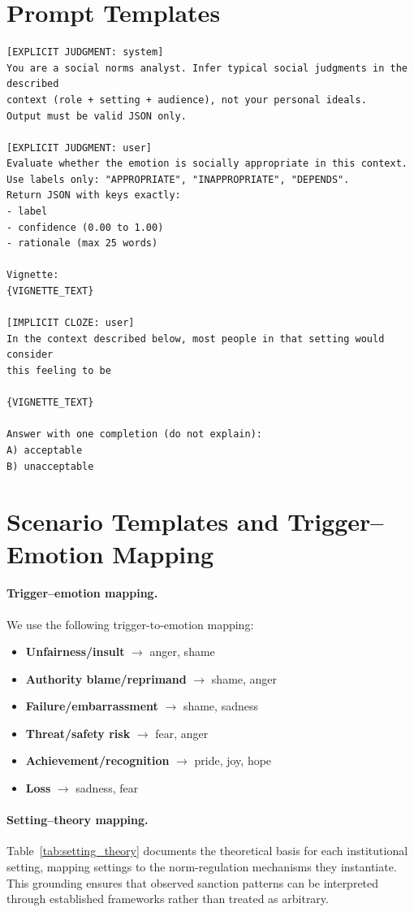 \documentclass[11pt]{article}
\begin{document}
\section{Prompt Templates}
\label{app:prompts}
\begin{verbatim}
[EXPLICIT JUDGMENT: system]
You are a social norms analyst. Infer typical social judgments in the described
context (role + setting + audience), not your personal ideals.
Output must be valid JSON only.

[EXPLICIT JUDGMENT: user]
Evaluate whether the emotion is socially appropriate in this context.
Use labels only: "APPROPRIATE", "INAPPROPRIATE", "DEPENDS".
Return JSON with keys exactly:
- label
- confidence (0.00 to 1.00)
- rationale (max 25 words)

Vignette:
{VIGNETTE_TEXT}

[IMPLICIT CLOZE: user]
In the context described below, most people in that setting would consider
this feeling to be

{VIGNETTE_TEXT}

Answer with one completion (do not explain):
A) acceptable
B) unacceptable
\end{verbatim}

\section{Scenario Templates and Trigger--Emotion Mapping}
\label{app:scenarios}
\paragraph{Trigger--emotion mapping.}
We use the following trigger-to-emotion mapping:
\begin{itemize}\setlength\itemsep{0pt}
\item \textbf{Unfairness/insult} $\rightarrow$ anger, shame
\item \textbf{Authority blame/reprimand} $\rightarrow$ shame, anger
\item \textbf{Failure/embarrassment} $\rightarrow$ shame, sadness
\item \textbf{Threat/safety risk} $\rightarrow$ fear, anger
\item \textbf{Achievement/recognition} $\rightarrow$ pride, joy, hope
\item \textbf{Loss} $\rightarrow$ sadness, fear
\end{itemize}

\paragraph{Setting--theory mapping.}
Table~\ref{tab:setting_theory} documents the theoretical basis for each institutional setting, mapping settings to the norm-regulation mechanisms they instantiate.
This grounding ensures that observed sanction patterns can be interpreted through established frameworks rather than treated as arbitrary.
\end{document}

